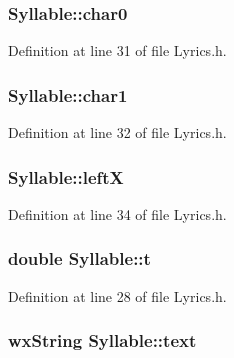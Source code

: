 \subsubsection[{\texorpdfstring{char0}{char0}}]{ Syllable\+::char0}\hypertarget{struct_syllable_adc9a564a55ae8b2b3ca6dbffeef8d7db}{}\label{struct_syllable_adc9a564a55ae8b2b3ca6dbffeef8d7db}


Definition at line 31 of file Lyrics.\+h.

\subsubsection[{\texorpdfstring{char1}{char1}}]{ Syllable\+::char1}\hypertarget{struct_syllable_acb38e4d950a9a8a2b0f726806bfa6702}{}\label{struct_syllable_acb38e4d950a9a8a2b0f726806bfa6702}


Definition at line 32 of file Lyrics.\+h.

\subsubsection[{\texorpdfstring{leftX}{leftX}}]{ Syllable\+::leftX}\hypertarget{struct_syllable_a2c41f08cff808a46566a5c477d738e53}{}\label{struct_syllable_a2c41f08cff808a46566a5c477d738e53}


Definition at line 34 of file Lyrics.\+h.

\subsubsection[{\texorpdfstring{t}{t}}]{\setlength{\rightskip}{0pt plus 5cm}double Syllable\+::t}\hypertarget{struct_syllable_a8bda2fd870861df184ec61fd0d5c4f24}{}\label{struct_syllable_a8bda2fd870861df184ec61fd0d5c4f24}


Definition at line 28 of file Lyrics.\+h.

\subsubsection[{\texorpdfstring{text}{text}}]{\setlength{\rightskip}{0pt plus 5cm}wx\+String Syllable\+::text}\hypertarget{struct_syllable_a59be29e552e2652ec239635fee387ba7}{}\label{struct_syllable_a59be29e552e2652ec239635fee387ba7}


